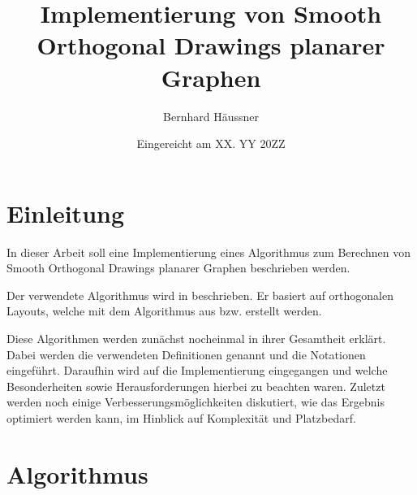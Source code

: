 \documentclass[a4paper]{scrreprt}
\theoremstyle{definition}
\begin{document}


\subject{Bachelorarbeit}
\title{Implementierung von Smooth Orthogonal Drawings planarer Graphen} %
\author{Bernhard Häussner} %
\date{Eingereicht am XX. YY 20ZZ} %
\titlehead{Julius-Maximilians-Universität Würzburg\\
Institut für Informatik\\
Lehrstuhl für Informatik I\\
Effiziente Algorithmen und wissensbasierte Systeme}
\publishers{Betreuer:\\
Prof.\ Dr.\ Alexander Wolff\\
Dipl.-Inf.\ Philipp Kindermann} %
\maketitle
\tableofcontents






\chapter{Einleitung}

In dieser Arbeit soll eine Implementierung eines Algorithmus 
zum Berechnen von Smooth Orthogonal Drawings planarer Graphen beschrieben werden.

Der verwendete Algorithmus wird in \cite{smooth-13} beschrieben. Er basiert auf orthogonalen
Layouts, welche mit dem Algorithmus aus \cite{biedl+kant-98} bzw. \cite{liu+etal-98} erstellt
werden.

Diese Algorithmen werden zunächst nocheinmal in ihrer Gesamtheit erklärt. Dabei werden die
verwendeten Definitionen genannt und die Notationen eingeführt. Daraufhin wird auf
die Implementierung eingegangen und welche Besonderheiten sowie Herausforderungen hierbei zu
beachten waren. Zuletzt werden noch einige Verbesserungsmöglichkeiten diskutiert, wie das Ergebnis
optimiert werden kann, im Hinblick auf Komplexität und Platzbedarf.

\chapter{Algorithmus}
\end{document}
